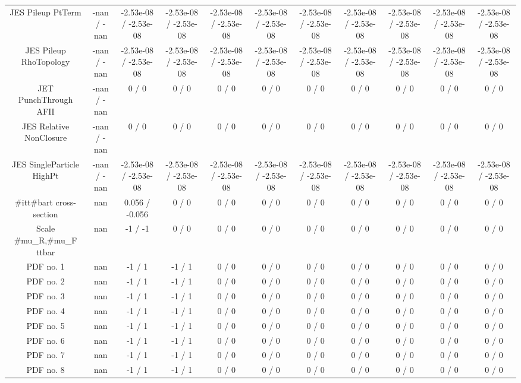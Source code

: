 \begin{table}[htbp]
\begin{center}
\begin{tabular}{|c|c|c|c|c|c|c|c|c|c|c|}
  JES Pileup PtTerm & -nan / -nan & -2.53e-08 / -2.53e-08 & -2.53e-08 / -2.53e-08 & -2.53e-08 / -2.53e-08 & -2.53e-08 / -2.53e-08 & -2.53e-08 / -2.53e-08 & -2.53e-08 / -2.53e-08 & -2.53e-08 / -2.53e-08 & -2.53e-08 / -2.53e-08 & -2.53e-08 / -2.53e-08 \\ 
  JES Pileup RhoTopology & -nan / -nan & -2.53e-08 / -2.53e-08 & -2.53e-08 / -2.53e-08 & -2.53e-08 / -2.53e-08 & -2.53e-08 / -2.53e-08 & -2.53e-08 / -2.53e-08 & -2.53e-08 / -2.53e-08 & -2.53e-08 / -2.53e-08 & -2.53e-08 / -2.53e-08 & -2.53e-08 / -2.53e-08 \\ 
  JET PunchThrough AFII & -nan / -nan & 0 / 0 & 0 / 0 & 0 / 0 & 0 / 0 & 0 / 0 & 0 / 0 & 0 / 0 & 0 / 0 & 0 / 0 \\ 
  JES Relative NonClosure & -nan / -nan & 0 / 0 & 0 / 0 & 0 / 0 & 0 / 0 & 0 / 0 & 0 / 0 & 0 / 0 & 0 / 0 & 0 / 0 \\ 
  JES SingleParticle HighPt & -nan / -nan & -2.53e-08 / -2.53e-08 & -2.53e-08 / -2.53e-08 & -2.53e-08 / -2.53e-08 & -2.53e-08 / -2.53e-08 & -2.53e-08 / -2.53e-08 & -2.53e-08 / -2.53e-08 & -2.53e-08 / -2.53e-08 & -2.53e-08 / -2.53e-08 & -2.53e-08 / -2.53e-08 \\ 
  #it{t#bar{t}} cross-section &    nan    & 0.056 / -0.056 & 0 / 0 & 0 / 0 & 0 / 0 & 0 / 0 & 0 / 0 & 0 / 0 & 0 / 0 & 0 / 0 \\ 
  Scale #mu_{R},#mu_{F} ttbar &    nan    & -1 / -1 & 0 / 0 & 0 / 0 & 0 / 0 & 0 / 0 & 0 / 0 & 0 / 0 & 0 / 0 & 0 / 0 \\ 
  PDF no. 1 &    nan    & -1 / 1 & -1 / 1 & 0 / 0 & 0 / 0 & 0 / 0 & 0 / 0 & 0 / 0 & 0 / 0 & 0 / 0 \\ 
  PDF no. 2 &    nan    & -1 / 1 & -1 / 1 & 0 / 0 & 0 / 0 & 0 / 0 & 0 / 0 & 0 / 0 & 0 / 0 & 0 / 0 \\ 
  PDF no. 3 &    nan    & -1 / 1 & -1 / 1 & 0 / 0 & 0 / 0 & 0 / 0 & 0 / 0 & 0 / 0 & 0 / 0 & 0 / 0 \\ 
  PDF no. 4 &    nan    & -1 / 1 & -1 / 1 & 0 / 0 & 0 / 0 & 0 / 0 & 0 / 0 & 0 / 0 & 0 / 0 & 0 / 0 \\ 
  PDF no. 5 &    nan    & -1 / 1 & -1 / 1 & 0 / 0 & 0 / 0 & 0 / 0 & 0 / 0 & 0 / 0 & 0 / 0 & 0 / 0 \\ 
  PDF no. 6 &    nan    & -1 / 1 & -1 / 1 & 0 / 0 & 0 / 0 & 0 / 0 & 0 / 0 & 0 / 0 & 0 / 0 & 0 / 0 \\ 
  PDF no. 7 &    nan    & -1 / 1 & -1 / 1 & 0 / 0 & 0 / 0 & 0 / 0 & 0 / 0 & 0 / 0 & 0 / 0 & 0 / 0 \\ 
  PDF no. 8 &    nan    & -1 / 1 & -1 / 1 & 0 / 0 & 0 / 0 & 0 / 0 & 0 / 0 & 0 / 0 & 0 / 0 & 0 / 0 \\ 

\end{tabular}
\end{center}
\end{table}
